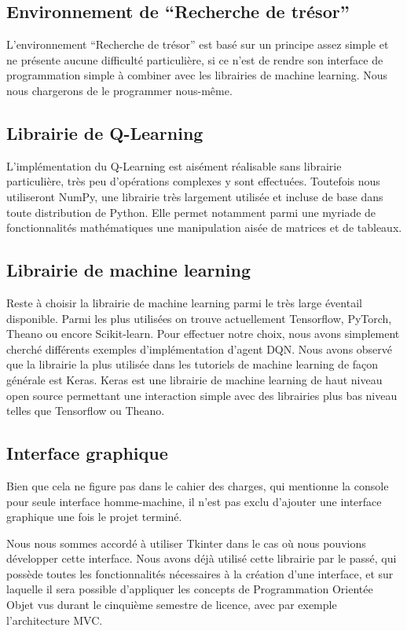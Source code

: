 \subsection{Environnement de ``Recherche de trésor''}
L'environnement ``Recherche de trésor'' est basé sur un principe assez simple et ne présente aucune difficulté particulière, si ce n'est de rendre son interface de programmation simple à combiner avec les librairies de machine learning. Nous nous chargerons de le programmer nous-même.


\subsection{Librairie de Q-Learning}
L'implémentation du Q-Learning est aisément réalisable sans librairie particulière, très peu d'opérations complexes y sont effectuées. Toutefois nous utiliseront NumPy, une librairie très largement utilisée et incluse de base dans toute distribution de Python. Elle permet notamment parmi une myriade de fonctionnalités mathématiques une manipulation aisée de matrices et de tableaux.

\subsection{Librairie de machine learning}
Reste à choisir la librairie de machine learning parmi le très large éventail disponible. Parmi les plus utilisées on trouve actuellement Tensorflow, PyTorch, Theano ou encore Scikit-learn. Pour effectuer notre choix, nous avons simplement cherché différents exemples d'implémentation d'agent DQN. Nous avons observé que la librairie la plus utilisée dans les tutoriels de machine learning de façon générale est Keras. Keras est une librairie de machine learning de haut niveau open source permettant une interaction simple avec des librairies plus bas niveau telles que Tensorflow ou Theano.

\subsection{Interface graphique}
Bien que cela ne figure pas dans le cahier des charges, qui mentionne la console pour seule interface homme-machine, il n'est pas exclu d'ajouter une interface graphique une fois le projet terminé.
\par
Nous nous sommes accordé à utiliser Tkinter dans le cas où nous pouvions développer cette interface. Nous avons déjà utilisé cette librairie par le passé, qui possède toutes les fonctionnalités nécessaires à la création d'une interface, et sur laquelle il sera possible d'appliquer les concepts de Programmation Orientée Objet vus durant le cinquième semestre de licence, avec par exemple l'architecture MVC.
